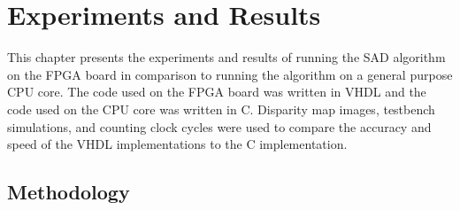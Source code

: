 \newcolumntype{+}{>{\global\let\currentrowstyle\relax}}
\newcolumntype{^}{>{\currentrowstyle}}
\newcommand{\rowstyle}[1]{\gdef\currentrowstyle{#1}%
#1\ignorespaces
}

\newcommand{\specialcell}[2][c]{%
  \begin{tabular}[#1]{@{}c@{}}#2\end{tabular}}

{}


\chapter{Experiments and Results}
\label{sec:exp}

This chapter presents the experiments and results of running the SAD algorithm on the FPGA board in comparison to running the algorithm on a general purpose CPU core. The code used on the FPGA board was written in VHDL and the code used on the CPU core was written in C. Disparity map images, testbench simulations, and counting clock cycles were used to compare the accuracy and speed of the VHDL implementations to the C implementation.

\section{Methodology}
\label{sec:method}

